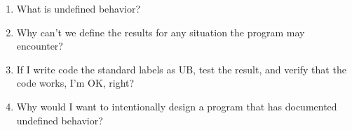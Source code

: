 \begin{enumerate}
\item 
What is undefined behavior?

\item 
Why can't we define the results for any situation the program may encounter?

\item 
If I write code the standard labels as UB, test the result, and verify that the code works, I'm OK, right?

\item
Why would I want to intentionally design a program that has documented undefined behavior?

\end{enumerate}